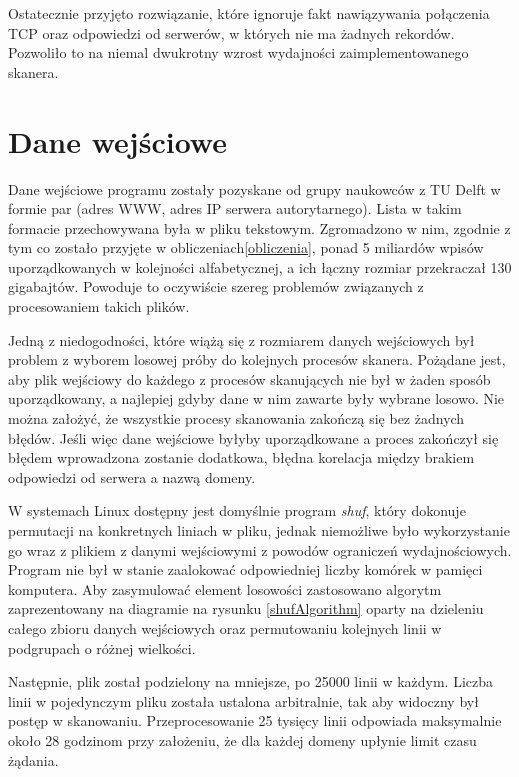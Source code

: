 Ostatecznie przyjęto rozwiązanie, które ignoruje fakt nawiązywania połączenia TCP oraz odpowiedzi od serwerów, w których nie ma żadnych rekordów. Pozwoliło to na niemal dwukrotny wzrost wydajności zaimplementowanego skanera.

\section{Dane wejściowe}
Dane wejściowe programu zostały pozyskane od grupy naukowców z TU Delft\cite{delft} w formie par (adres WWW, adres IP serwera autorytarnego). Lista w takim formacie przechowywana była w pliku tekstowym. Zgromadzono w nim, zgodnie z tym co zostało przyjęte w obliczeniach\ref{obliczenia}, ponad 5 miliardów wpisów uporządkowanych w kolejności alfabetycznej, a ich łączny rozmiar przekraczał 130 gigabajtów. Powoduje to oczywiście szereg problemów związanych z procesowaniem takich plików. 

Jedną z niedogodności, które wiążą się z rozmiarem danych wejściowych był problem z wyborem losowej próby do kolejnych procesów skanera. Pożądane jest, aby plik wejściowy do każdego z procesów skanujących nie był w żaden sposób uporządkowany, a najlepiej gdyby dane w nim zawarte były wybrane losowo. Nie można założyć, że wszystkie procesy skanowania zakończą się bez żadnych błędów. Jeśli więc dane wejściowe byłyby uporządkowane a proces zakończył się błędem wprowadzona zostanie dodatkowa, błędna korelacja między brakiem odpowiedzi od serwera a nazwą domeny.

W systemach Linux dostępny jest domyślnie program \textit{shuf}\cite{shuf}, który dokonuje permutacji na konkretnych liniach w pliku, jednak niemożliwe było wykorzystanie go wraz z plikiem z danymi wejściowymi z powodów ograniczeń wydajnościowych. Program nie był w stanie zaalokować odpowiedniej liczby komórek w pamięci komputera. Aby zasymulować element losowości zastosowano algorytm zaprezentowany na diagramie na rysunku \ref{shufAlgorithm} oparty na dzieleniu całego zbioru danych wejściowych oraz permutowaniu kolejnych linii w podgrupach o różnej wielkości.

Następnie, plik został podzielony na mniejsze, po 25000 linii w każdym. Liczba linii w pojedynczym pliku została ustalona arbitralnie, tak aby widoczny był postęp w skanowaniu. Przeprocesowanie 25 tysięcy linii odpowiada maksymalnie około 28 godzinom przy założeniu, że dla każdej domeny upłynie limit czasu żądania.

